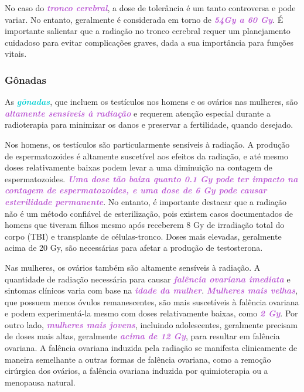 \documentclass[11pt,a4paper]{article}
\begin{document}
	No caso do \textcolor{MediumOrchid}{\textbf{\textit{tronco cerebral}}}, a dose de tolerância é um tanto controversa e pode variar. No entanto, geralmente é considerada em torno de \textcolor{MediumOrchid}{\textbf{\textit{54Gy a 60 Gy}}}. É importante salientar que a radiação no tronco cerebral requer um planejamento cuidadoso para evitar complicações graves, dada a sua importância para funções vitais.

\subsubsection*{Gônadas}

	As \textcolor{DarkTurquoise}{\textbf{\textit{gônadas}}}, que incluem os testículos nos homens e os ovários nas mulheres, são \textcolor{MediumOrchid}{\textbf{\textit{altamente sensíveis à radiação}}} e requerem atenção especial durante a radioterapia para minimizar os danos e preservar a fertilidade, quando desejado.

	Nos homens, os testículos são particularmente sensíveis à radiação. A produção de espermatozoides é altamente suscetível aos efeitos da radiação, e até mesmo doses relativamente baixas podem levar a uma diminuição na contagem de espermatozoides. \textcolor{MediumOrchid}{\textbf{\textit{Uma dose tão baixa quanto 0.1 Gy pode ter impacto na contagem de espermatozoides, e uma dose de 6 Gy pode causar esterilidade permanente}}}. No entanto, é importante destacar que a radiação não é um método confiável de esterilização, pois existem casos documentados de homens que tiveram filhos mesmo após receberem 8 Gy de irradiação total do corpo (TBI) e transplante de células-tronco. Doses mais elevadas, geralmente acima de 20 Gy, são necessárias para afetar a produção de testosterona.

	Nas mulheres, os ovários também são altamente sensíveis à radiação. A quantidade de radiação necessária para causar \textcolor{MediumOrchid}{\textbf{\textit{falência ovariana imediata}}} e sintomas clínicos varia com base na \textcolor{MediumOrchid}{\textbf{\textit{idade da mulher}}}. \textcolor{MediumOrchid}{\textbf{\textit{Mulheres mais velhas}}}, que possuem menos óvulos remanescentes, são mais suscetíveis à falência ovariana e podem experimentá-la mesmo com doses relativamente baixas, como \textcolor{MediumOrchid}{\textbf{\textit{2 Gy}}}. Por outro lado, \textcolor{MediumOrchid}{\textbf{\textit{mulheres mais jovens}}}, incluindo adolescentes, geralmente precisam de doses mais altas, geralmente \textcolor{MediumOrchid}{\textbf{\textit{acima de 12 Gy}}}, para resultar em falência ovariana. A falência ovariana induzida pela radiação se manifesta clinicamente de maneira semelhante a outras formas de falência ovariana, como a remoção cirúrgica dos ovários, a falência ovariana induzida por quimioterapia ou a menopausa natural.
\end{document}
